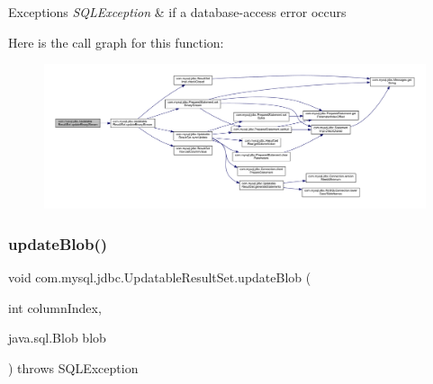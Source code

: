 \begin{DoxyExceptions}{Exceptions}
{\em S\+Q\+L\+Exception} & if a database-\/access error occurs \\
\hline
\end{DoxyExceptions}
Here is the call graph for this function\+:
\nopagebreak
\begin{figure}[H]
\begin{center}
\leavevmode
\includegraphics[width=350pt]{classcom_1_1mysql_1_1jdbc_1_1_updatable_result_set_a6475f3584890264f9c67c2e749c37141_cgraph}
\end{center}
\end{figure}
\mbox{\label{classcom_1_1mysql_1_1jdbc_1_1_updatable_result_set_ad0944789b1d55512febb7da626bed70d}} 
\subsubsection{\texorpdfstring{update\+Blob()}{updateBlob()}\hspace{0.1cm}{\footnotesize\ttfamily [1/2]}}
{\footnotesize\ttfamily void com.\+mysql.\+jdbc.\+Updatable\+Result\+Set.\+update\+Blob (\begin{DoxyParamCaption}\item[{int}]{column\+Index,  }\item[{java.\+sql.\+Blob}]{blob }\end{DoxyParamCaption}) throws S\+Q\+L\+Exception}

